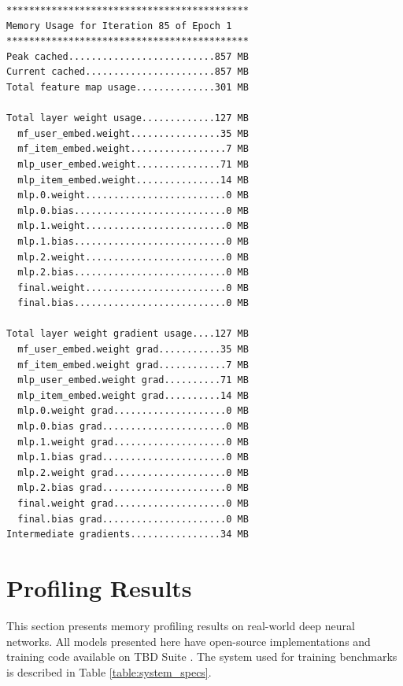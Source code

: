 \documentclass[12pt,letterpaper]{article}
\begin{document}
\begin{verbatim}
*******************************************
Memory Usage for Iteration 85 of Epoch 1
*******************************************
Peak cached..........................857 MB
Current cached.......................857 MB
Total feature map usage..............301 MB

Total layer weight usage.............127 MB
  mf_user_embed.weight................35 MB
  mf_item_embed.weight.................7 MB
  mlp_user_embed.weight...............71 MB
  mlp_item_embed.weight...............14 MB
  mlp.0.weight.........................0 MB
  mlp.0.bias...........................0 MB
  mlp.1.weight.........................0 MB
  mlp.1.bias...........................0 MB
  mlp.2.weight.........................0 MB
  mlp.2.bias...........................0 MB
  final.weight.........................0 MB
  final.bias...........................0 MB

Total layer weight gradient usage....127 MB
  mf_user_embed.weight grad...........35 MB
  mf_item_embed.weight grad............7 MB
  mlp_user_embed.weight grad..........71 MB
  mlp_item_embed.weight grad..........14 MB
  mlp.0.weight grad....................0 MB
  mlp.0.bias grad......................0 MB
  mlp.1.weight grad....................0 MB
  mlp.1.bias grad......................0 MB
  mlp.2.weight grad....................0 MB
  mlp.2.bias grad......................0 MB
  final.weight grad....................0 MB
  final.bias grad......................0 MB
Intermediate gradients................34 MB
\end{verbatim}

%
%
\section{Profiling Results}
\label{profiling_results}
This section presents memory profiling results on real-world deep neural networks. All models presented here have open-source implementations and training code available on TBD Suite \cite{tbd_suite}. The system used for training benchmarks is described in Table \ref{table:system_specs}.

\begin{table}[H]
\centering
{}
\caption{Specification of system used for profiling}
\label{table:system_specs}
\end{table}
\end{document}
